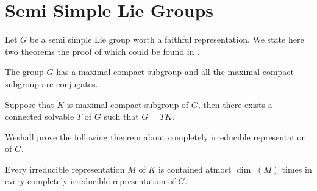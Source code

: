 \section{Semi Simple Lie Groups}\label{part2:chap1:sec5}

Let $G$ be a semi simple Lie group worth a faithful representation. We
state here two theorems the proof of which could be found in \cite{19}. 
\begin{theorem}\label{part2:chap1:sec5:thm2}
  The group $G$ has a maximal compact subgroup and all the maximal
  compact subgroup are conjugates. 
\end{theorem} 
 
\begin{theorem}\label{part2:chap1:sec5:thm3}
  Suppose that $K$ is maximal compact subgroup of $G$, then there
  exists a connected solvable $T$ of $G$ such that $G=TK$. 
\end{theorem} 
 
 We\pageoriginale shall prove the following theorem about completely irreducible
 representation of $G$. 
  
\begin{theorem}\label{part2:chap1:sec5:thm4}
  Every irreducible representation $M$ of $K$ is contained atmost $\dim$
  $(M)$ times in every completely irreducible representation of $G$. 
\end{theorem} 
 
